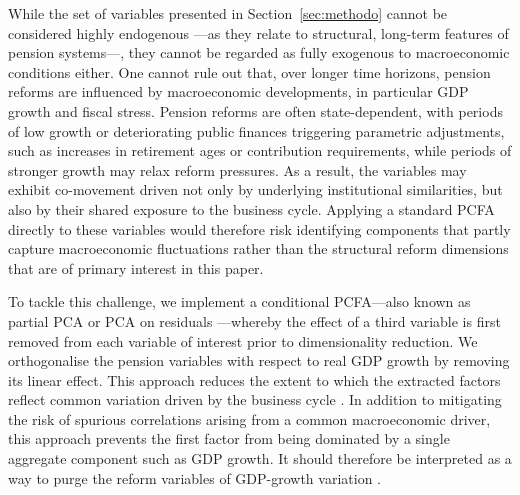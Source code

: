 \documentclass[11pt,english,a4paper, twoside, authoryear]{article}
\begin{document}

While the set of variables presented in Section~\ref{sec:methodo} cannot be considered highly endogenous ---as they relate to structural, long-term features of pension systems---, they cannot be regarded as fully exogenous to macroeconomic conditions either. One cannot rule out that, over longer time horizons, pension reforms are influenced by macroeconomic developments, in particular GDP growth and fiscal stress. Pension reforms are often state-dependent, with periods of low growth or deteriorating public finances triggering parametric adjustments, such as increases in retirement ages or contribution requirements, while periods of stronger growth may relax reform pressures. As a result, the variables may exhibit co-movement driven not only by underlying institutional similarities, but also by their shared exposure to the business cycle. Applying a standard PCFA directly to these variables would therefore risk identifying components that partly capture macroeconomic fluctuations rather than the structural reform dimensions that are of primary interest in this paper.

To tackle this challenge, we implement a conditional PCFA---also known as partial PCA or PCA on residuals \citep{Boone2020}---whereby the effect of a third variable is first removed from each variable of interest prior to dimensionality reduction. We orthogonalise the pension variables with respect to real GDP growth by removing its linear effect. This approach reduces the extent to which the extracted factors reflect common variation driven by the business cycle%
. In addition to mitigating the risk of spurious correlations arising from a common macroeconomic driver, this approach prevents the first factor from being dominated by a single aggregate component such as GDP growth. It should therefore be interpreted as a way to purge the reform variables of GDP-growth variation%
.
\end{document}
